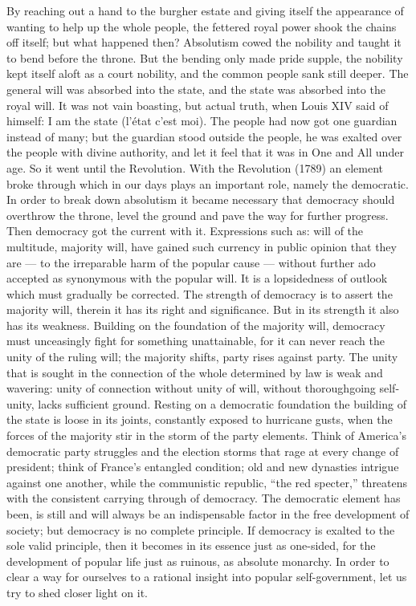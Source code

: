\documentclass[12pt,a4paper,openany]{book}
\newcommand{\opage}[1]{\marginnote{\footnotesize\textit{[#1]}}}
\begin{document}
By reaching out a hand to the burgher estate and giving itself
the appearance of wanting to help up the whole people, the
fettered royal power shook the chains off itself; but what
happened then? Absolutism cowed the nobility and taught it to
bend before the throne. But the bending only made pride
supple, the nobility kept itself aloft as a court nobility,
and the common people sank still deeper. The general will
was absorbed into the state, and the state was absorbed into the royal will.
It was not vain boasting, but actual truth,
\setcounter{footnote}{0}%
\opage{23}when Louis XIV said of himself: I am the state
(l'état c'est moi). The people had now got one guardian
instead of many; but the guardian stood outside
the people, he was exalted over the people with divine authority,
and let it feel that it was in One and All
under age. So it went until the Revolution. With the Revolution
(1789) an element broke through which in
our days plays an important role, namely the democratic.
In order to break down absolutism it became necessary
that democracy should overthrow the throne, level the ground
and pave the way for further progress. Then democracy got
the current with it. Expressions such as: will of the multitude,
majority will, have gained such currency in
public opinion that they are --- to the irreparable harm of
the popular cause --- without further ado accepted as synonymous
with the popular will. It is a lopsidedness of outlook
which must gradually be corrected. The strength of democracy is
to assert the majority will, therein it has its right
and significance. But in its strength it also has its
weakness. Building on the foundation of the majority will,
democracy must unceasingly fight for something unattainable, for
it can never reach the unity of the ruling will;
the majority shifts, party rises against party.
The unity that is sought in the connection of the whole determined by law
is weak and wavering: unity of connection
without unity of will, without thoroughgoing self-unity,
lacks sufficient ground. Resting on a democratic
foundation the building of the state is loose in its joints, constantly
exposed to hurricane gusts, when the forces of the majority stir
in the storm of the party elements. Think of America's democratic
party struggles and the election storms that rage at
every change of president; think of France's
\setcounter{footnote}{0}%
\opage{24}entangled condition; old and new dynasties intrigue
against one another, while the communistic republic,
``the red specter,'' threatens with the consistent
carrying through of democracy. The democratic element has
been, is still and will always be an indispensable factor
in the free development of society; but democracy is no
complete principle. If democracy is exalted to the sole
valid principle, then it becomes in its essence just as
one-sided, for the development of popular life just as ruinous,
as absolute monarchy. In order to
clear a way for ourselves to a rational insight into popular self-government,
let us try to shed closer light on it.
\end{document}

